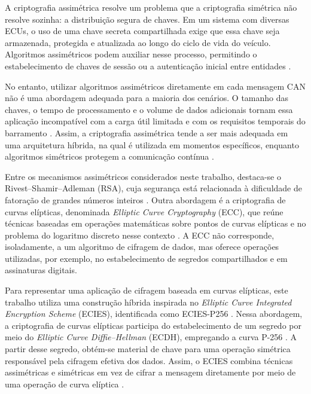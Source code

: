 A criptografia assimétrica resolve um problema que a criptografia simétrica não resolve sozinha: a distribuição segura de chaves. Em um sistema com diversas ECUs, o uso de uma chave secreta compartilhada exige que essa chave seja armazenada, protegida e atualizada ao longo do ciclo de vida do veículo. Algoritmos assimétricos podem auxiliar nesse processo, permitindo o estabelecimento de chaves de sessão ou a autenticação inicial entre entidades \cite{mundhenk2017security}.

No entanto, utilizar algoritmos assimétricos diretamente em cada mensagem CAN não é uma abordagem adequada para a maioria dos cenários. O tamanho das chaves, o tempo de processamento e o volume de dados adicionais tornam essa aplicação incompatível com a carga útil limitada e com os requisitos temporais do barramento \cite{tian2020secure}. Assim, a criptografia assimétrica tende a ser mais adequada em uma arquitetura híbrida, na qual é utilizada em momentos específicos, enquanto algoritmos simétricos protegem a comunicação contínua \cite{muter2010structured}.

Entre os mecanismos assimétricos considerados neste trabalho, destaca-se o Rivest--Shamir--Adleman (RSA), cuja segurança está relacionada à dificuldade de fatoração de grandes números inteiros \cite{boneh1999twenty}. Outra abordagem é a criptografia de curvas elípticas, denominada \textit{Elliptic Curve Cryptography} (ECC), que reúne técnicas baseadas em operações matemáticas sobre pontos de curvas elípticas e no problema do logaritmo discreto nesse contexto \cite{miller1985use,galbraith2012mathematics}. A ECC não corresponde, isoladamente, a um algoritmo de cifragem de dados, mas oferece operações utilizadas, por exemplo, no estabelecimento de segredos compartilhados e em assinaturas digitais.

Para representar uma aplicação de cifragem baseada em curvas elípticas, este trabalho utiliza uma construção híbrida inspirada no \textit{Elliptic Curve Integrated Encryption Scheme} (ECIES), identificada como ECIES-P256 \cite{ieee1363a2004}. Nessa abordagem, a criptografia de curvas elípticas participa do estabelecimento de um segredo por meio do \textit{Elliptic Curve Diffie--Hellman} (ECDH), empregando a curva P-256 \cite{miller1985use}. A partir desse segredo, obtém-se material de chave para uma operação simétrica responsável pela cifragem efetiva dos dados. Assim, o ECIES combina técnicas assimétricas e simétricas em vez de cifrar a mensagem diretamente por meio de uma operação de curva elíptica \cite{ieee1363a2004}.

